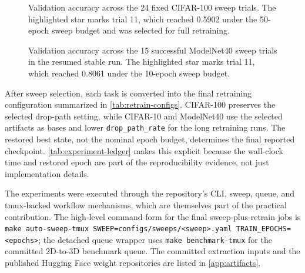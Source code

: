 \begin{figure}[t]
  \centering
  
  \caption{Validation accuracy across the 24 fixed CIFAR-100 sweep trials. The highlighted star marks trial 11, which reached 0.5902 under the 50-epoch sweep budget and was selected for full retraining.}
  \label{fig:cifar100-sweep}
\end{figure}

\begin{figure}[t]
  \centering
  
  \caption{Validation accuracy across the 15 successful ModelNet40 sweep trials in the resumed stable run. The highlighted star marks trial 11, which reached 0.8061 under the 10-epoch sweep budget.}
  \label{fig:modelnet-sweep}
\end{figure}

\clearpage

After sweep selection, each task is converted into the final retraining configuration summarized in \autoref{tab:retrain-configs}. CIFAR-100 preserves the selected drop-path setting, while CIFAR-10 and ModelNet40 use the selected artifacts as bases and lower \texttt{drop\_path\_rate} for the long retraining runs. The restored best state, not the nominal epoch budget, determines the final reported checkpoint. \autoref{tab:experiment-ledger} makes this explicit because the wall-clock time and restored epoch are part of the reproducibility evidence, not just implementation details.

The experiments were executed through the repository's CLI, sweep, queue, and tmux-backed workflow mechanisms, which are themselves part of the practical contribution. The high-level command form for the final sweep-plus-retrain jobs is \texttt{make auto-sweep-tmux SWEEP=configs/sweeps/<sweep>.yaml TRAIN\_EPOCHS=<epochs>}; the detached queue wrapper uses \texttt{make benchmark-tmux} for the committed 2D-to-3D benchmark queue. The committed extraction inputs and the published Hugging Face weight repositories are listed in \autoref{app:artifacts}.
